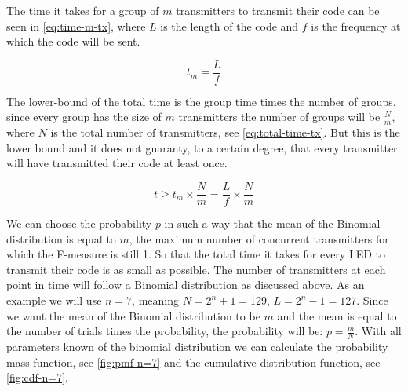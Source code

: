 		The time it takes for a group of $m$ transmitters to transmit their code can be seen in \autoref{eq:time-m-tx}, where $L$ is the length of the code and $f$ is the frequency at which the code will be sent. 

		\begin{equation}
			\label{eq:time-m-tx}
			t_{m} = \frac{L}{f}
		\end{equation}

		The lower-bound of the total time is the group time times the number of groups, since every group has the size of $m$ transmitters the number of groups will be $\frac{N}{m}$, where $N$ is the total number of transmitters, see \autoref{eq:total-time-tx}.
		But this is the lower bound and it does not guaranty, to a certain degree, that every transmitter will have transmitted their code at least once.

		\begin{equation}
			\label{eq:total-time-tx}
			t \ge t_{m} \times \frac{N}{m} = \frac{L}{f} \times \frac{N}{m}
		\end{equation}




		We can choose the probability $p$ in such a way that the mean of the Binomial distribution is equal to $m$, the maximum number of concurrent transmitters for which the F-measure is still 1.
		So that the total time it takes for every LED to transmit their code is as small as possible.
		The number of transmitters at each point in time will follow a Binomial distribution as discussed above. As an example we will use $n = 7$, meaning $N = 2^n + 1 = 129$, $L = 2^n - 1 = 127$.
		Since we want the mean of the Binomial distribution to be $m$ and the mean is equal to the number of trials times the probability, the probability will be: $p = \frac{m}{N}$.
		With all parameters known of the binomial distribution we can calculate the probability mass function, see \autoref{fig:pmf-n=7} and the cumulative distribution function, see \autoref{fig:cdf-n=7}.

